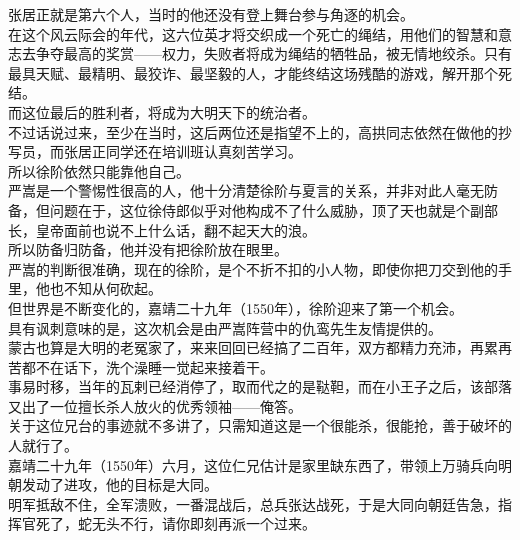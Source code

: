 \begin{multicols}{\theparacolNo}
张居正就是第六个人，当时的他还没有登上舞台参与角逐的机会。\\

在这个风云际会的年代，这六位英才将交织成一个死亡的绳结，用他们的智慧和意志去争夺最高的奖赏——权力，失败者将成为绳结的牺牲品，被无情地绞杀。只有最具天赋、最精明、最狡诈、最坚毅的人，才能终结这场残酷的游戏，解开那个死结。\\

而这位最后的胜利者，将成为大明天下的统治者。\\

不过话说过来，至少在当时，这后两位还是指望不上的，高拱同志依然在做他的抄写员，而张居正同学还在培训班认真刻苦学习。\\

所以徐阶依然只能靠他自己。\\

严嵩是一个警惕性很高的人，他十分清楚徐阶与夏言的关系，并非对此人毫无防备，但问题在于，这位徐侍郎似乎对他构成不了什么威胁，顶了天也就是个副部长，皇帝面前也说不上什么话，翻不起天大的浪。\\

所以防备归防备，他并没有把徐阶放在眼里。\\

严嵩的判断很准确，现在的徐阶，是个不折不扣的小人物，即使你把刀交到他的手里，他也不知从何砍起。\\

但世界是不断变化的，嘉靖二十九年（1550年），徐阶迎来了第一个机会。\\

具有讽刺意味的是，这次机会是由严嵩阵营中的仇鸾先生友情提供的。\\

蒙古也算是大明的老冤家了，来来回回已经搞了二百年，双方都精力充沛，再累再苦都不在话下，洗个澡睡一觉起来接着干。\\

事易时移，当年的瓦剌已经消停了，取而代之的是鞑靼，而在小王子之后，该部落又出了一位擅长杀人放火的优秀领袖——俺答。\\

关于这位兄台的事迹就不多讲了，只需知道这是一个很能杀，很能抢，善于破坏的人就行了。\\

嘉靖二十九年（1550年）六月，这位仁兄估计是家里缺东西了，带领上万骑兵向明朝发动了进攻，他的目标是大同。\\

明军抵敌不住，全军溃败，一番混战后，总兵张达战死，于是大同向朝廷告急，指挥官死了，蛇无头不行，请你即刻再派一个过来。\\


\end{multicols}
